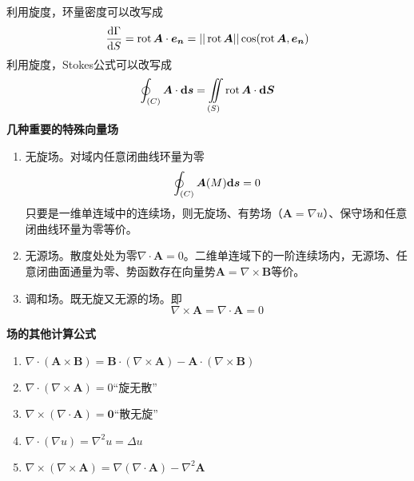 利用旋度，环量密度可以改写成
\begin{equation}\label{key}
	\dfrac{\mathrm{d} \Gamma}{\mathrm{d} S}= \operatorname{rot} \bm{A}\cdot \bm{e_n}=||\operatorname{rot} \bm{A}||\cos (\operatorname{rot} \bm{A},\bm{e_n})
\end{equation}
利用旋度，Stokes公式可以改写成
\begin{equation}\label{key}
	\oint_{(C)}\bm{A}\cdot \bm{\mathrm{d} s}=\iint\limits_{(S)}\operatorname{rot}\bm{A}\cdot \bm{\mathrm{d} S}
\end{equation}
\textbf{几种重要的特殊向量场}
\begin{enumerate}
	\item 无旋场。对域内任意闭曲线环量为零
	\begin{equation}\label{key}
		\oint_{(C)}\bm{A}(M)\bm{\mathrm{d} s}=0
	\end{equation}
	只要是一维单连域中的连续场，则无旋场、有势场（$\bm{A}=\nabla u$）、保守场和任意闭曲线环量为零等价。
	\item 无源场。散度处处为零$\nabla \cdot \bm{A}=0$。二维单连域下的一阶连续场内，无源场、任意闭曲面通量为零、势函数存在向量势$\bm{A}=\nabla \times \bm{B}$等价。
	\item 调和场。既无旋又无源的场。即
	\begin{equation}\label{key}
		\nabla\times \bm{A}=\nabla\cdot \bm{A}=0
	\end{equation}
\end{enumerate}
\textbf{场的其他计算公式}
\begin{enumerate}
	\item $ \nabla \cdot (\bm{A}\times \bm{B})=\bm{B}\cdot (\nabla \times \bm{A})- \bm{A}\cdot (\nabla \times \bm{B})$
	\item $ \nabla \cdot (\nabla \times \bm{A})=0 $“旋无散”
	\item $ \nabla \times (\nabla \cdot \bm{A})=\bm{0} $“散无旋”
	\item $ \nabla \cdot (\nabla u)=\nabla^2u=\Delta u $
	\item $ \nabla\times (\nabla \times \bm{A})=\nabla(\nabla \cdot \bm{A})-\nabla^2\bm{A} $
\end{enumerate}
